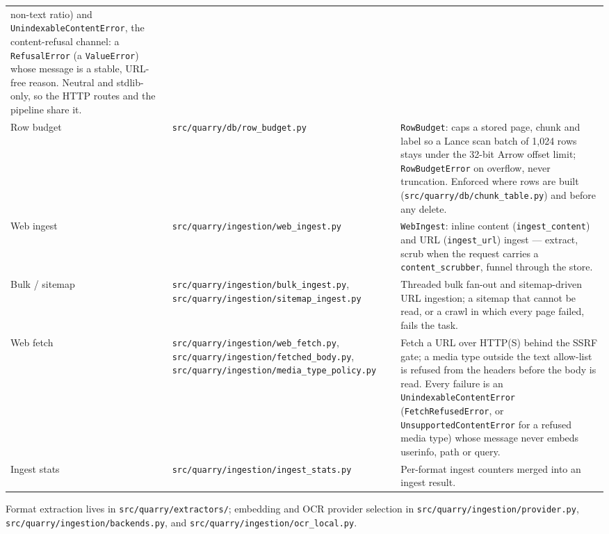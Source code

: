 \documentclass[a4paper,10pt]{article}
\newcommand{\modpath}[1]{\texttt{src/quarry/#1}}
\begin{document}
\begin{center}
\begin{tabular}{llp{7cm}}
              non-text ratio) and \texttt{UnindexableContentError}, the
              content-refusal channel: a \texttt{RefusalError} (a
              \texttt{ValueError}) whose message is a stable, URL-free
              reason.  Neutral and stdlib-only, so the HTTP
              routes and the pipeline share it. \\
Row budget  & \modpath{db/row\_budget.py} & \texttt{RowBudget}: caps a stored
              page, chunk and label so a Lance scan batch of 1,024 rows stays
              under the 32-bit Arrow offset limit; \texttt{RowBudgetError} on
              overflow, never truncation.  Enforced where rows are built
              (\modpath{db/chunk\_table.py}) and before any delete. \\
Web ingest  & \modpath{ingestion/web\_ingest.py} & \texttt{WebIngest}:
              inline content (\texttt{ingest\_content}) and URL
              (\texttt{ingest\_url}) ingest --- extract, scrub when the
              request carries a \texttt{content\_scrubber}, funnel through
              the store. \\
Bulk / sitemap & \modpath{ingestion/bulk\_ingest.py},
              \modpath{ingestion/sitemap\_ingest.py} & Threaded bulk fan-out
              and sitemap-driven URL ingestion; a sitemap that cannot be read,
              or a crawl in which every page failed, fails the task. \\
Web fetch   & \modpath{ingestion/web\_fetch.py},
              \modpath{ingestion/fetched\_body.py},
              \modpath{ingestion/media\_type\_policy.py} & Fetch a URL over
              HTTP(S) behind the SSRF gate; a media type outside the text
              allow-list is refused from the headers before the body is read.
              Every failure is an \texttt{UnindexableContentError}
              (\texttt{FetchRefusedError}, or \texttt{UnsupportedContentError}
              for a refused media type) whose message never embeds userinfo,
              path or query. \\
Ingest stats & \modpath{ingestion/ingest\_stats.py} & Per-format ingest
              counters merged into an ingest result. \\
\bottomrule
\end{tabular}
\end{center}

Format extraction lives in \modpath{extractors/}; embedding and OCR
provider selection in \modpath{ingestion/provider.py},
\modpath{ingestion/backends.py}, and \modpath{ingestion/ocr\_local.py}.
\end{document}
